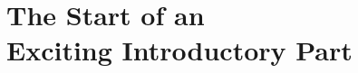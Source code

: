 \hypertarget{part:PartI}{
    \part[The Start of an Exciting Introductory Part]{%
        \centering
        The Start of an \\Exciting Introductory Part%
    }}
\thispagestyle{empty}
